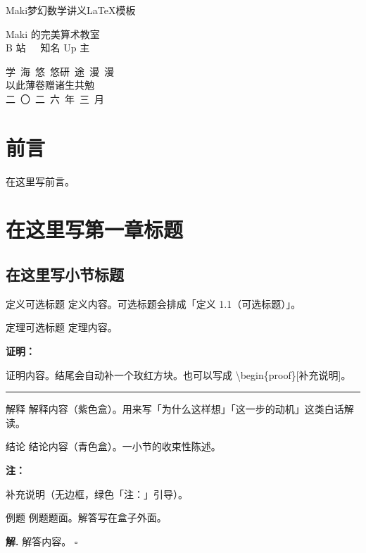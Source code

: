 \documentclass[a4paper,12pt,oneside,fontset=none]{ctexbook}
\newcommand{\MakeTitlePage}{%
    \begin{titlepage}
        \centering
        \vspace*{5cm}
        
        {\fontsize{48pt}{60pt}\selectfont\heavykaishu \color{LogicColor} Maki梦幻数学讲义LaTeX模板\par}
        
        \vfill
        
        {\LARGE \kaishu 
        Maki 的完美算术教室
        \\[0.8em]
        \Large
        B 站\ \ \ 知名 Up 主
        \\
        }
    
        \vspace{2.3cm}
        
        {\Large \kaishu
        学\ 海\ 悠\ 悠\quad 研\ 途\ 漫\ 漫
        \\[0.3em]
        {\Large 以此薄卷赠诸生共勉}
        \\[2.5em]
        
        二\ 〇\ 二\ 六\ 年\ 三\ 月 
        }
        
        \vspace{2cm}
    \end{titlepage}%
}
\newcounter{theorem}[chapter]
\newenvironment{theorem}[1][]{\begin{thmBox}{定理}{#1}}{\end{thmBox}}
\newcounter{definition}[chapter]
\newenvironment{definition}[1][]{\begin{defBox}{定义}{#1}}{\end{defBox}}
\newcounter{example}[chapter]
\newenvironment{example}[1][]{\begin{exBox}{例题}{#1}}{\end{exBox}}
\newenvironment{explanation}[1][]{\begin{expBox}{解释}{#1}}{\end{expBox}}
\newenvironment{conclusion}[1][]{\begin{conclBox}{结论}{#1}}{\end{conclBox}}
\newenvironment{note}{
    \par\vspace{0.5em}\noindent
    \textbf{\color{NoteColor} 注：}
}{
    \par\vspace{0.5em}
}
\renewenvironment{proof}[1][]{
    \par\vspace{0.5em}\noindent
    \textbf{\color{LogicColor} 证明\ifstrempty{#1}{}{（#1）}：}
}{
    \hfill \textcolor{LogicColor}{\rule{0.6em}{0.6em}} \par
}
\numberwithin{equation}{chapter}
\begin{document}
\frontmatter

\MakeTitlePage

\chapter*{前言}
在这里写前言。

\tableofcontents

\mainmatter

\chapter{在这里写第一章标题}

\section{在这里写小节标题}

\begin{definition}[可选标题]
定义内容。可选标题会排成「定义 1.1（可选标题）」。
\end{definition}

\begin{theorem}[可选标题]
定理内容。
\end{theorem}

\begin{proof}
证明内容。结尾会自动补一个玫红方块。也可以写成 \textbackslash begin\{proof\}[补充说明]。
\end{proof}

\begin{explanation}
解释内容（紫色盒）。用来写「为什么这样想」「这一步的动机」这类白话解读。
\end{explanation}

\begin{conclusion}
结论内容（青色盒）。一小节的收束性陈述。
\end{conclusion}

\begin{note}
补充说明（无边框，绿色「注：」引导）。
\end{note}

\begin{example}
例题题面。解答写在盒子外面。
\end{example}

\textbf{解.} 解答内容。 \hfill $\square$
\end{document}
